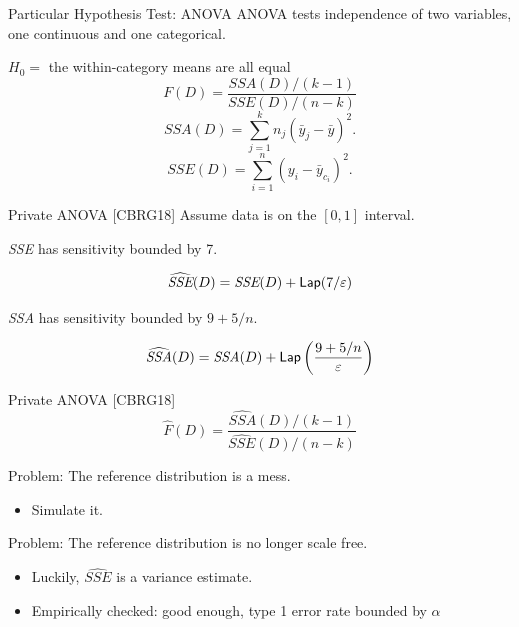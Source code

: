 \documentclass{beamer}
\newcommand{\sse}{\textit{SSE}\xspace}
\newcommand{\ssa}{\textit{SSA}\xspace}
\newcommand{\lap}{\ensuremath{{\sf Lap}}\xspace}
\begin{document}
\begin{frame}{Particular Hypothesis Test: ANOVA}
ANOVA tests independence of two variables, one continuous and one categorical.\pause
\bigskip

$H_0=$ the within-category means are all equal \pause
\begin{equation*}
F(D) = \frac{\ssa(D)/(k-1)}{\sse(D)/(n-k)}
\end{equation*} 
\pause
\begin{equation*}
\ssa(D) = \sum_{j=1}^{k} n_j (\bar{y}_j - \bar{y})^2.
\end{equation*}
\pause
\begin{equation*}
\sse(D) = \sum_{i=1}^{n}  (y_{i}-\bar{y}_{c_i})^2.
\end{equation*}
\end{frame}

\begin{frame}{Private ANOVA [CBRG18]}
Assume data is on the $[0,1]$ interval. \pause
\begin{theorem}
\sse has sensitivity bounded by 7.
\end{theorem}
\pause
$$\widehat{\sse}(D) = \sse(D) + \lap(7/\varepsilon) $$
\pause
\begin{theorem}
\ssa has sensitivity bounded by $9 + 5/n$.
\end{theorem}
\pause
$$\widehat{\ssa}(D) = \ssa(D) + \lap\left(\frac{9+5/n}{\varepsilon}\right) $$
\end{frame}

\begin{frame}{Private ANOVA [CBRG18]}
$$\widehat{F}(D) = \frac{\widehat{\ssa}(D)/(k-1)}{\widehat{\sse}(D)/(n-k)}$$
\bigskip

 \pause
Problem: The reference distribution is a mess. \pause
\begin{itemize}
\item Simulate it.
\end{itemize}

 \pause
Problem: The reference distribution is no longer scale free.  \pause
\begin{itemize}
\item Luckily, $\widehat{\sse}$ is a variance estimate.  \pause
\item Empirically checked: good enough, type 1 error rate bounded by $\alpha$
\end{itemize}
\end{frame}
\end{document}

